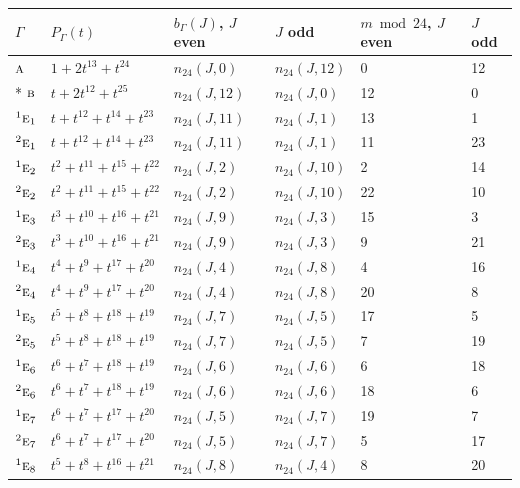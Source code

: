 \documentclass[10pt,a4paper]{article}
\numberwithin{equation}{section}
\newcommand{\irr}[1]{\text{\normalfont\scshape #1}}
\newcommand{\conjpair}[1]{{}^{#1}}
\begin{document}
{\small\begin{longtable}{@{}llllll@{}}\toprule
$\Gamma$ & $P_\Gamma(t)$ & $b_\Gamma(J)$, $J$ even & $J$ odd & $m \bmod 24$, $J$ even & $J$ odd\\\midrule\endhead
\bottomrule\endfoot\endlastfoot
$\irr{a}$ & $1 + 2t^{13} + t^{24}$ & $n_{24}(J,0)$ & $n_{24}(J,12)$ & 0 & 12\\*
$\irr{b}$ & $t + 2t^{12} + t^{25}$ & $n_{24}(J,12)$ & $n_{24}(J,0)$ & 12 & 0\\
$\conjpair{1}\irr{e}_{1}$ & $t + t^{12} + t^{14} + t^{23}$ & $n_{24}(J,11)$ & $n_{24}(J,1)$ & 13 & 1\\
$\conjpair{2}\irr{e}_{1}$ & $t + t^{12} + t^{14} + t^{23}$ & $n_{24}(J,11)$ & $n_{24}(J,1)$ & 11 & 23\\
$\conjpair{1}\irr{e}_{2}$ & $t^{2} + t^{11} + t^{15} + t^{22}$ & $n_{24}(J,2)$ & $n_{24}(J,10)$ & 2 & 14\\
$\conjpair{2}\irr{e}_{2}$ & $t^{2} + t^{11} + t^{15} + t^{22}$ & $n_{24}(J,2)$ & $n_{24}(J,10)$ & 22 & 10\\
$\conjpair{1}\irr{e}_{3}$ & $t^{3} + t^{10} + t^{16} + t^{21}$ & $n_{24}(J,9)$ & $n_{24}(J,3)$ & 15 & 3\\
$\conjpair{2}\irr{e}_{3}$ & $t^{3} + t^{10} + t^{16} + t^{21}$ & $n_{24}(J,9)$ & $n_{24}(J,3)$ & 9 & 21\\
$\conjpair{1}\irr{e}_{4}$ & $t^{4} + t^{9} + t^{17} + t^{20}$ & $n_{24}(J,4)$ & $n_{24}(J,8)$ & 4 & 16\\
$\conjpair{2}\irr{e}_{4}$ & $t^{4} + t^{9} + t^{17} + t^{20}$ & $n_{24}(J,4)$ & $n_{24}(J,8)$ & 20 & 8\\
$\conjpair{1}\irr{e}_{5}$ & $t^{5} + t^{8} + t^{18} + t^{19}$ & $n_{24}(J,7)$ & $n_{24}(J,5)$ & 17 & 5\\
$\conjpair{2}\irr{e}_{5}$ & $t^{5} + t^{8} + t^{18} + t^{19}$ & $n_{24}(J,7)$ & $n_{24}(J,5)$ & 7 & 19\\
$\conjpair{1}\irr{e}_{6}$ & $t^{6} + t^{7} + t^{18} + t^{19}$ & $n_{24}(J,6)$ & $n_{24}(J,6)$ & 6 & 18\\
$\conjpair{2}\irr{e}_{6}$ & $t^{6} + t^{7} + t^{18} + t^{19}$ & $n_{24}(J,6)$ & $n_{24}(J,6)$ & 18 & 6\\
$\conjpair{1}\irr{e}_{7}$ & $t^{6} + t^{7} + t^{17} + t^{20}$ & $n_{24}(J,5)$ & $n_{24}(J,7)$ & 19 & 7\\
$\conjpair{2}\irr{e}_{7}$ & $t^{6} + t^{7} + t^{17} + t^{20}$ & $n_{24}(J,5)$ & $n_{24}(J,7)$ & 5 & 17\\
$\conjpair{1}\irr{e}_{8}$ & $t^{5} + t^{8} + t^{16} + t^{21}$ & $n_{24}(J,8)$ & $n_{24}(J,4)$ & 8 & 20\\

\end{longtable}}
\end{document}
